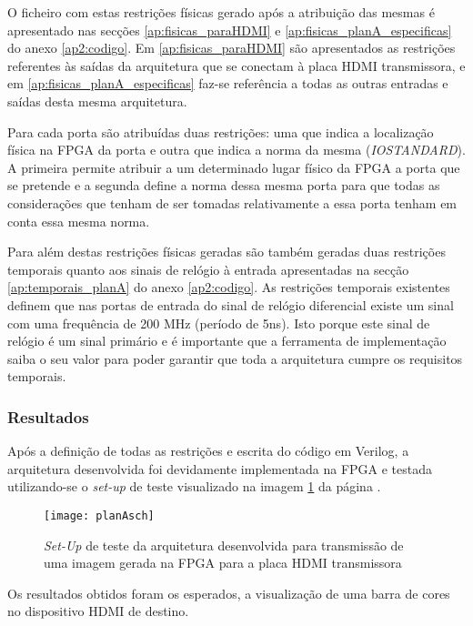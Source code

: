 O ficheiro com estas restrições físicas gerado após a atribuição das mesmas é apresentado nas secções \ref{ap:fisicas_paraHDMI} e \ref{ap:fisicas_planA_especificas} do anexo \ref{ap2:codigo}. Em  \ref{ap:fisicas_paraHDMI} são apresentados as restrições referentes às saídas da arquitetura que se conectam à placa HDMI transmissora, e em \ref{ap:fisicas_planA_especificas} faz-se referência a todas as outras entradas e saídas desta mesma arquitetura.

Para cada porta são atribuídas duas restrições: uma que indica a localização física na FPGA da porta e outra que indica a norma da mesma (\textit{IOSTANDARD}). A primeira permite atribuir a um determinado lugar físico da FPGA a porta que se pretende e a segunda define a norma dessa mesma porta para que todas as considerações que tenham de ser tomadas relativamente a essa porta tenham em conta essa mesma norma.

Para além destas restrições físicas geradas são também geradas duas restrições temporais quanto aos sinais de relógio à entrada apresentadas na secção \ref{ap:temporais_planA} do anexo \ref{ap2:codigo}. As restrições temporais existentes definem que nas portas de entrada do sinal de relógio diferencial existe um sinal com uma frequência de 200 MHz (período de 5ns). Isto porque este sinal de relógio é um sinal primário e é importante que a ferramenta de implementação saiba o seu valor para poder garantir que toda a arquitetura cumpre os requisitos temporais.

\subsubsection*{Resultados}

Após a definição de todas as restrições e escrita do código em Verilog, a arquitetura desenvolvida foi devidamente implementada na FPGA e testada utilizando-se o \textit{set-up} de teste visualizado na imagem \ref{fig:planA_sch} da página \pageref{fig:planA_sch}.

\begin{figure}[h!]
	\begin{center}
		\leavevmode
		\texttt{[image: planAsch]}
		\caption{\textit{Set-Up} de teste da arquitetura desenvolvida para transmissão de uma imagem gerada na FPGA para a placa HDMI transmissora}
		\label{fig:planA_sch}
	\end{center}
\end{figure}

Os resultados obtidos foram os esperados, a visualização de uma barra de cores no dispositivo HDMI de destino.


